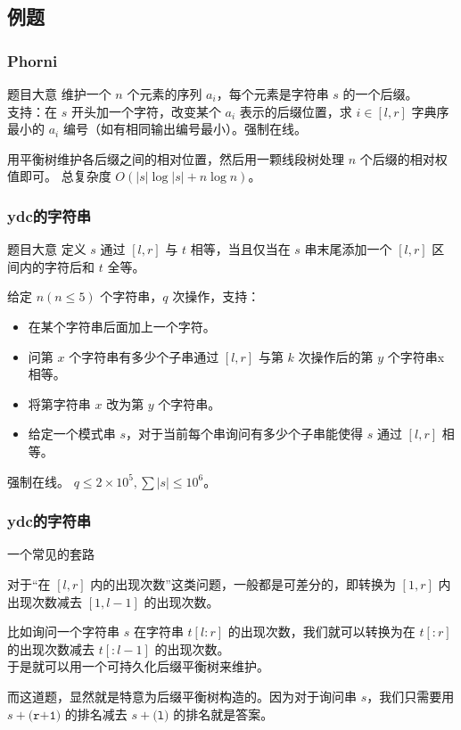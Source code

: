 \documentclass[UTF8]{beamer}
\begin{document}
\begin{CJK}{UTF8}{song}
\subsection{例题}
\begin{frame}
	\frametitle{Phorni}
	\begin{block}{题目大意}
	维护一个 $n$ 个元素的序列 $a_i$，每个元素是字符串 $s$ 的一个后缀。\\
	支持：在 $s$ 开头加一个字符，改变某个 $a_i$ 表示的后缀位置，求 $i\in [l,r]$ 字典序最小的 $a_i$ 编号（如有相同输出编号最小）。强制在线。
	\end{block}
	\pause
	\par
	用平衡树维护各后缀之间的相对位置，然后用一颗线段树处理 $n$ 个后缀的相对权值即可。
	总复杂度 $O(|s|\log |s|+n\log n)$。
\end{frame}
\begin{frame}
	\frametitle{ydc的字符串}
	\begin{block}{题目大意}
	定义 $s$ 通过 $[l,r]$ 与 $t$ 相等，当且仅当在 $s$ 串末尾添加一个 $[l,r]$ 区间内的字符后和 $t$ 全等。
	\pause
	\par
	给定 $n(n\leq 5)$ 个字符串，$q$ 次操作，支持：
	\begin{itemize}
	\item 在某个字符串后面加上一个字符。
	\item 问第 $x$ 个字符串有多少个子串通过 $[l,r]$ 与第 $k$ 次操作后的第 $y$ 个字符串x相等。
	\item 将第字符串 $x$ 改为第 $y$ 个字符串。
	\item 给定一个模式串 $s$，对于当前每个串询问有多少个子串能使得 $s$ 通过 $[l,r]$ 相等。
	\end{itemize}
	强制在线。
	$q\leq 2\times10^5,\sum|s|\leq 10^6$。
	\end{block}
\end{frame}
\begin{frame}
	\frametitle{ydc的字符串}
	\begin{block}{一个常见的套路}
	\pause
	\par
	对于“在 $[l,r]$ 内的出现次数”这类问题，一般都是可差分的，即转换为 $[1,r]$ 内出现次数减去 $[1,l-1]$ 的出现次数。
	\pause
	\par
	比如询问一个字符串 $s$ 在字符串 $t[l:r]$ 的出现次数，我们就可以转换为在 $t[:r]$ 的出现次数减去 $t[:l-1]$ 的出现次数。\\
	于是就可以用一个可持久化后缀平衡树来维护。
	\end{block}
	\pause
	\par
	而这道题，显然就是特意为后缀平衡树构造的。因为对于询问串 $s$，我们只需要用 $s+\texttt{(r+1)}$ 的排名减去 $s+\texttt{(l)}$ 的排名就是答案。

\end{frame}
\end{CJK}
\end{document}
